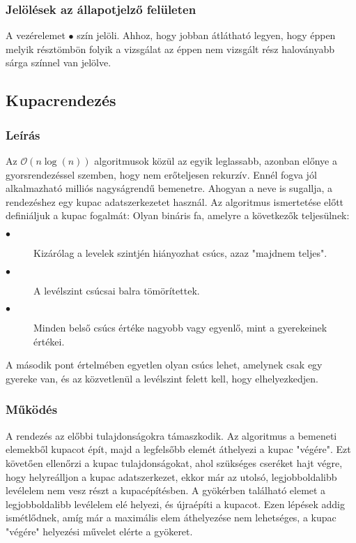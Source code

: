 \documentclass{elteikthesis}
\begin{document}
\subsubsection{Jelölések az állapotjelző felületen}
A vezérelemet \textcolor{select}{\Huge$\bullet$} szín jelöli. Ahhoz, hogy jobban átlátható legyen, hogy éppen melyik résztömbön folyik a vizsgálat az éppen nem vizsgált rész haloványabb sárga színnel van jelölve.

\subsection{Kupacrendezés}
\subsubsection{Leírás}
Az $\mathcal{O}(n\log (n))$ algoritmusok közül az egyik leglassabb, azonban előnye a gyorsrendezéssel szemben, hogy nem erőteljesen rekurzív. Ennél fogva jól alkalmazható milliós nagyságrendű bemenetre. Ahogyan a neve is sugallja, a rendezéshez egy kupac adatszerkezetet használ. Az algoritmus ismertetése előtt definiáljuk a kupac fogalmát\cite{Fekete}:
Olyan bináris fa, amelyre a következők teljesülnek:
\begin{description}
	\item[$\bullet$] Kizárólag a levelek szintjén hiányozhat csúcs, azaz "majdnem teljes".
	\item[$\bullet$] A levélszint csúcsai balra tömörítettek.
	\item[$\bullet$] Minden belső csúcs értéke nagyobb vagy egyenlő, mint a gyerekeinek értékei.
\end{description}
A második pont értelmében egyetlen olyan csúcs lehet, amelynek csak egy gyereke van, és az közvetlenül a levélszint felett kell, hogy elhelyezkedjen.\par
\subsubsection{Működés}
A rendezés az előbbi tulajdonságokra támaszkodik. 
Az algoritmus a bemeneti elemekből kupacot épít, majd a legfelsőbb elemét áthelyezi a kupac "végére". Ezt követően ellenőrzi a kupac tulajdonságokat, ahol szükséges cseréket hajt végre, hogy helyreálljon a kupac adatszerkezet, ekkor már az utolsó, legjobboldalibb levélelem nem vesz részt a kupacépítésben. A gyökérben található elemet a legjobboldalibb levélelem elé helyezi, és újraépíti a kupacot. Ezen lépések addig ismétlődnek, amíg már a maximális elem áthelyezése nem lehetséges, a kupac "végére" helyezési művelet elérte a gyökeret.\par
\end{document}
